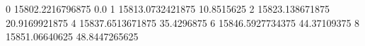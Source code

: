 0 15802.2216796875 0.0
1 15813.0732421875 10.8515625
2 15823.138671875 20.9169921875
4 15837.6513671875 35.4296875
6 15846.5927734375 44.37109375
8 15851.06640625 48.8447265625
